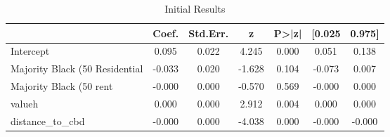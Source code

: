 \begin{table}[h]
\centering
\caption{Initial Results}
\label{tab:initial_results}
\begin{tabular}{lcccccc}
\toprule
 & Coef. & Std.Err. & z & P>|z| & [0.025 & 0.975] \\
\midrule
Intercept & 0.095 & 0.022 & 4.245 & 0.000 & 0.051 & 0.138 \\
Majority Black (50%
Residential & -0.033 & 0.020 & -1.628 & 0.104 & -0.073 & 0.007 \\
Majority Black (50%
rent & -0.000 & 0.000 & -0.570 & 0.569 & -0.000 & 0.000 \\
valueh & 0.000 & 0.000 & 2.912 & 0.004 & 0.000 & 0.000 \\
distance_to_cbd & -0.000 & 0.000 & -4.038 & 0.000 & -0.000 & -0.000 \\
\bottomrule
\end{tabular}
\end{table}
